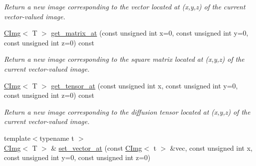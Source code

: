 \begin{DoxyCompactItemize}
\begin{DoxyCompactList}\small\item\em Return a new image corresponding to the vector located at ({\ttfamily x},{\ttfamily y},{\ttfamily z}) of the current vector-\/valued image. \item\end{DoxyCompactList}\item 
\hypertarget{structcimg__library_1_1CImg_a0df72293d6377a36cce47d73a4b6bbfc}{
\hyperlink{structcimg__library_1_1CImg}{CImg}$<$ T $>$ \hyperlink{structcimg__library_1_1CImg_a0df72293d6377a36cce47d73a4b6bbfc}{get\_\-matrix\_\-at} (const unsigned int x=0, const unsigned int y=0, const unsigned int z=0) const }
\label{structcimg__library_1_1CImg_a0df72293d6377a36cce47d73a4b6bbfc}

\begin{DoxyCompactList}\small\item\em Return a new image corresponding to the {\itshape square\/} {\itshape matrix\/} located at ({\ttfamily x},{\ttfamily y},{\ttfamily z}) of the current vector-\/valued image. \item\end{DoxyCompactList}\item 
\hypertarget{structcimg__library_1_1CImg_a82cfb268b952aeeb1b55e6072a83d093}{
\hyperlink{structcimg__library_1_1CImg}{CImg}$<$ T $>$ \hyperlink{structcimg__library_1_1CImg_a82cfb268b952aeeb1b55e6072a83d093}{get\_\-tensor\_\-at} (const unsigned int x, const unsigned int y=0, const unsigned int z=0) const }
\label{structcimg__library_1_1CImg_a82cfb268b952aeeb1b55e6072a83d093}

\begin{DoxyCompactList}\small\item\em Return a new image corresponding to the {\itshape diffusion\/} {\itshape tensor\/} located at ({\ttfamily x},{\ttfamily y},{\ttfamily z}) of the current vector-\/valued image. \item\end{DoxyCompactList}\item 
\hypertarget{structcimg__library_1_1CImg_a83c90e27cc58a73da616813898327966}{
{\footnotesize template$<$typename t $>$ }\\\hyperlink{structcimg__library_1_1CImg}{CImg}$<$ T $>$ \& \hyperlink{structcimg__library_1_1CImg_a83c90e27cc58a73da616813898327966}{set\_\-vector\_\-at} (const \hyperlink{structcimg__library_1_1CImg}{CImg}$<$ t $>$ \&vec, const unsigned int x, const unsigned int y=0, const unsigned int z=0)}
\label{structcimg__library_1_1CImg_a83c90e27cc58a73da616813898327966}


\end{DoxyCompactItemize}
